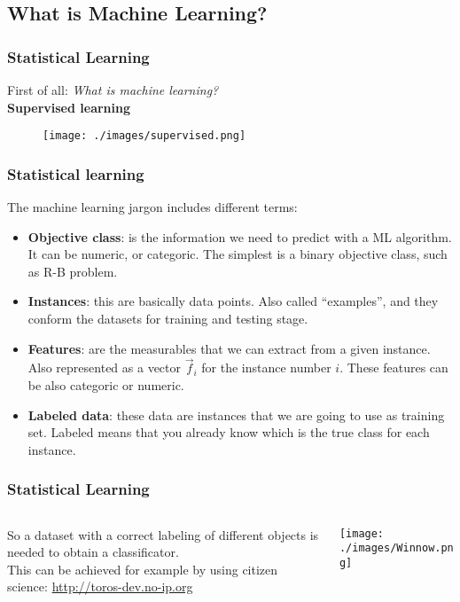 \documentclass[10pt]{beamer}
\begin{document}
\subsection{What is Machine Learning?} %
\begin{frame} \frametitle{Statistical Learning}
First of all: \textit{What is machine learning?}\\ \pause
\centering
\textbf{Supervised learning}
 \begin{figure}
 \texttt{[image: ./images/supervised.png]}
\end{figure}
\end{frame}
\begin{frame}\frametitle{Statistical learning}
 The machine learning jargon includes different terms:
 \begin{itemize}[<+->]
  \item \textbf{Objective class}: is the information we need to predict with a ML algorithm. It can be 
  numeric, or categoric. The simplest is a binary objective class, such as R-B problem.
  \item \textbf{Instances}: this are basically data points. Also called ``examples'', and they conform the
  datasets for training and testing stage.
  \item \textbf{Features}: are the measurables that we can extract from a given instance. Also represented as a vector
  $\vec{f}_i$ for the instance number $i$. These features can be also categoric or numeric. 
  \item \textbf{Labeled data}: these data are instances that we are going to use as training set. Labeled means that 
  you already know which is the true class for each instance.
 \end{itemize}
\end{frame}

\begin{frame} \frametitle{Statistical Learning}
\begin{columns}
 \begin{column}{0.3\textwidth}
 So a dataset with a correct labeling of different objects
 is needed to obtain a classificator.\\
 This can be achieved for example by using citizen science:
 \url{http://toros-dev.no-ip.org}
 \end{column}
 \begin{column}{0.7\textwidth}
 \begin{center}
 \texttt{[image: ./images/Winnow.png]}
\end{center}
\end{column}
\end{columns}

\end{frame}
\end{document}
